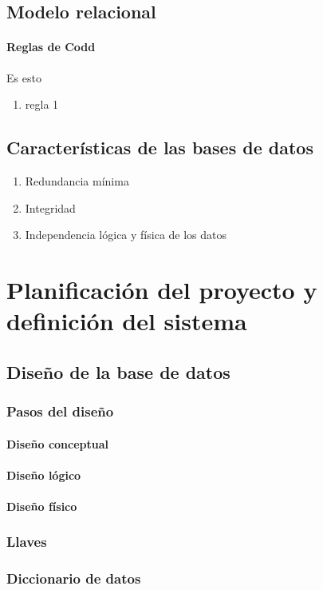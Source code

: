 \documentclass[12pt]{report}
\begin{document}
		\subsection{Modelo relacional}
			\paragraph{Reglas de Codd} Es esto
			\begin{enumerate}
				\item regla 1
			\end{enumerate}
		\subsection{Características de las bases de datos}
			\begin{enumerate}
				\item Redundancia mínima
				\item Integridad
				\item Independencia lógica y física de los datos
			\end{enumerate}
	\section{Planificación del proyecto y definición del sistema}
		\subsection{Diseño de la base de datos}
			\subsubsection{Pasos del diseño} %
				\paragraph{Diseño conceptual}
				\paragraph{Diseño lógico}
				\paragraph{Diseño físico}
			\subsubsection{Llaves}
			\subsubsection{Diccionario de datos}
\end{document}
